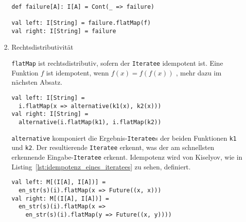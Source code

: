 \begin{enumerate}
    \begin{lstlisting}[caption=Nullelementregel, label=lst:nullelementregel]
def failure[A]: I[A] = Cont(_ => failure)

val left: I[String] = failure.flatMap(f)
val right: I[String] = failure
    \end{lstlisting}

  \item Rechtsdistributivität

    \lstinline|flatMap| ist rechtsdistributiv, sofern der \lstinline|Iteratee| idempotent ist.
    Eine Funktion $f$ ist idempotent, wenn $f(x) = f(f(x))$ \cite[vgl.][S.~1]{idempotence}, mehr dazu im nächsten Absatz.

    \begin{lstlisting}[caption=Rechtsdistributivitätsregel, label=lst:rechtsdistributivitaetsregel]
val left: I[String] =
  i.flatMap(x => alternative(k1(x), k2(x)))
val right: I[String] =
  alternative(i.flatMap(k1), i.flatMap(k2))
    \end{lstlisting}

    \lstinline|alternative| komponiert die Ergebnis-\lstinline|Iteratee|s der beiden Funktionen \lstinline|k1| und \lstinline|k2|.
    Der resultierende \lstinline|Iteratee| erkennt, was der am schnellsten erkennende Eingabe-\lstinline|Iteratee| erkennt.
    Idempotenz wird von Kiselyov, wie in Listing~\ref{lst:idempotenz_eines_iteratees} zu sehen, definiert.

    \begin{lstlisting}[caption=Idempotenz eines Iteratees, label=lst:idempotenz_eines_iteratees]
val left: M[(I[A], I[A])] =
  en_str(s)(i).flatMap(x => Future((x, x)))
val right: M[(I[A], I[A])] =
  en_str(s)(i).flatMap(x =>
    en_str(s)(i).flatMap(y => Future((x, y))))
    \end{lstlisting}
\end{enumerate}





